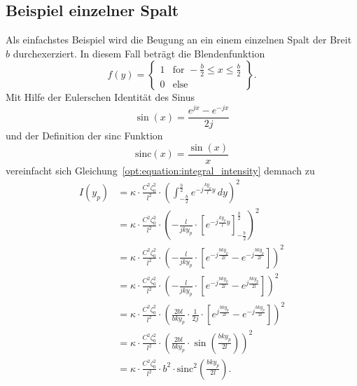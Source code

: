 \subsection{Beispiel einzelner Spalt}
Als einfachstes Beispiel wird die Beugung an ein einem einzelnen Spalt der Breit $b$ durchexerziert.
In diesem Fall beträgt die Blendenfunktion
\begin{equation}
f(y)
=
\left.
\begin{cases}
1 & \text{for } -\frac{b}{2} \leq x \leq \frac{b}{2} \\
0 & \text{else}
\end{cases}
\right\}
.
\end{equation}
Mit Hilfe der Eulerschen Identität des Sinus
\begin{equation}
\sin(x) = \frac{e^{jx} - e^{-jx}}{2j}
\end{equation}
und der Definition der sinc Funktion
\begin{equation}
\text{sinc}(x) = \frac{\sin(x)}{x}
\end{equation}
vereinfacht sich Gleichung~\ref{opt:equation:integral_intensity} demnach zu
\begin{align}
I(y_p)
&=
\kappa \cdot \frac{C^2\zeta_0^2}{l^2}\cdot \left(\int_{-\frac{b}{2}}^{\frac{b}{2}}e^{-j\frac{ky_p}{l}y} \,dy\right)^2
\\
&=
\kappa \cdot \frac{C^2\zeta_0^2}{l^2}\cdot \left(-\frac{l}{jky_p} \cdot \left[e^{-j\frac{ky_p}{l}y} \right]_{-\frac{b}{2}}^{\frac{b}{2}}\right)^2
\\
&=
\kappa \cdot \frac{C^2\zeta_0^2}{l^2}\cdot \left(-\frac{l}{jky_p} \cdot \left[e^{-j\frac{bky_p}{2l}} - e^{-j\frac{bky_p}{2l}}\right]\right)^2
\\
&=
\kappa \cdot \frac{C^2\zeta_0^2}{l^2}\cdot \left(-\frac{l}{jky_p} \cdot \left[e^{-j\frac{bky_p}{2l}} - e^{j\frac{bky_p}{2l}}\right]\right)^2
\\
&=
\kappa \cdot \frac{C^2\zeta_0^2}{l^2}\cdot \left(\frac{2bl}{bky_p} \cdot \frac{1}{2j} \cdot \left[e^{j\frac{bky_p}{2l}} - e^{-j\frac{bky_p}{2l}}\right]\right)^2
\\
&=
\kappa \cdot \frac{C^2\zeta_0^2}{l^2}\cdot \left(\frac{2bl}{bky_p} \cdot \sin\left(\frac{bky_p}{2l}\right)\right)^2
\\
&=
\kappa \cdot \frac{C^2\zeta_0^2}{l^2}\cdot b^2 \cdot \text{sinc}^2\left(\frac{bky_p}{2l}\right)
.
\end{align}
